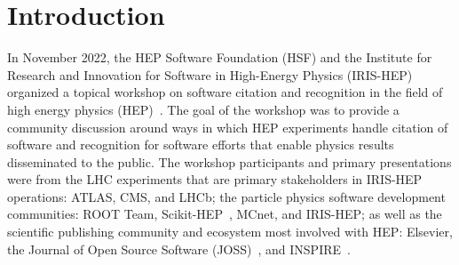 \section{Introduction}\label{sec:introduction}
In November 2022, the HEP Software Foundation (HSF) and the Institute for Research and Innovation for Software in High-Energy Physics (IRIS-HEP)~\cite{S2I2HEPSP,IRISHEPWEB} organized a topical workshop on software citation and recognition in the field of high energy physics (HEP)~\cite{software_citation_workshop_report,software_citation_indico}.
The goal of the workshop was to provide a community discussion around ways in which HEP experiments handle citation of software and recognition for software efforts that enable physics results disseminated to the public.
The workshop participants and primary presentations were from the LHC experiments that are primary stakeholders in IRIS-HEP operations: ATLAS, CMS, and LHCb; the particle physics software development communities: ROOT Team, Scikit-HEP~\cite{Rodrigues:2020syo}, MCnet, and IRIS-HEP; as well as the scientific publishing community and ecosystem most involved with HEP: Elsevier, the Journal of Open Source Software (JOSS)~\cite{smith_journal_2018}, and INSPIRE~\cite{INSPIRE}.
